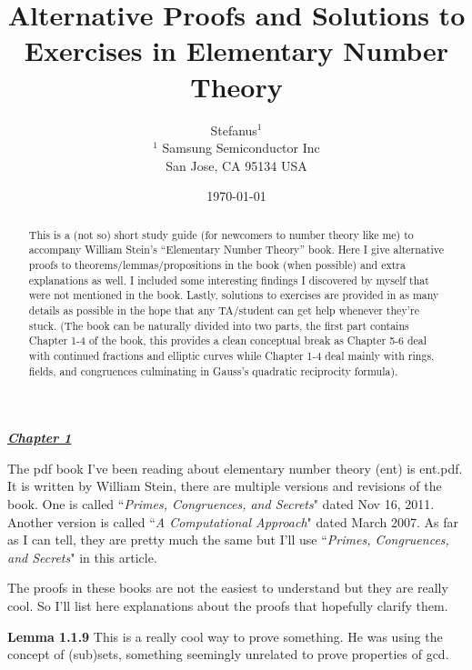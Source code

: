 \documentclass[aps,preprint,preprintnumbers,nofootinbib,showpacs,prd]{revtex4-1}
\begin{document}
\title{Alternative Proofs and Solutions to Exercises in Elementary Number Theory}
\bigskip
\author{Stefanus$^1$\\
$^1$ Samsung Semiconductor Inc\\ San Jose, CA 95134 USA\\
}
%
\date{\today}
%
\begin{abstract}
This is a (not so) short study guide (for newcomers to number theory like me) to accompany William Stein's ``Elementary Number Theory'' book. Here I give alternative proofs to theorems/lemmas/propositions in the book (when possible) and extra explanations as well. I included some interesting findings I discovered by myself that were not mentioned in the book. Lastly, solutions to exercises are provided in as many details as possible in the hope that any TA/student can get help whenever they're stuck. (The book can be naturally divided into two parts, the first part contains Chapter 1-4 of the book, this provides a clean conceptual break as Chapter 5-6 deal with continued fractions and elliptic curves while Chapter 1-4 deal mainly with rings, fields, and congruences culminating in Gauss's quadratic reciprocity formula).

\end{abstract}
%
\maketitle

\renewcommand{\theequation}{A.\arabic{equation}}  %
\setcounter{equation}{0}  %

\underline{\textbf{\textit{Chapter 1}}}
\bigskip

The pdf book I've been reading about elementary number theory (ent) is ent.pdf. It is written by William Stein, there are multiple versions and revisions of the book. One is called ``{\it Primes, Congruences, and Secrets}" dated Nov 16, 2011. Another version is called ``{\it A Computational Approach}" dated March 2007. As far as I can tell, they are pretty much the same but I'll use ``{\it Primes, Congruences, and Secrets}" in this article.

The proofs in these books are not the easiest to understand but they are really cool. So I'll list here explanations about the proofs that hopefully clarify them.

{\bf Lemma 1.1.9} This is a really cool way to prove something. He was using the concept of (sub)sets, something seemingly unrelated to prove properties of gcd.
\end{document}
